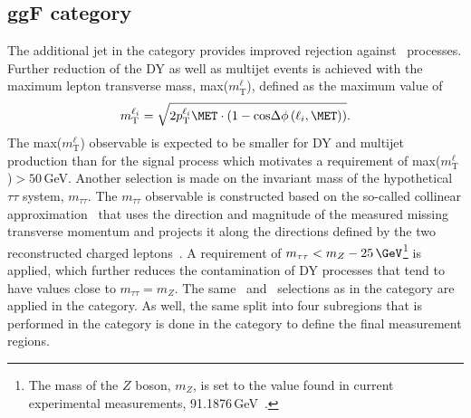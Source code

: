 \subsection{ggF \OneJet category}
\label{subsec:ggf-one-jet-category}
The additional jet in the \OneJet category provides improved rejection against \Ztautau\ processes.
Further reduction of the DY as well as multijet events is achieved with the maximum lepton transverse mass, max($m_{\text{T}}^\ell$), defined as the maximum value of 
\begin{equation}
    m_{\text{T}}^{\ell_i} = \sqrt{ 2 p_\text{T}^{\ell_i} \MET \cdot \left( 1 - \text{cos} \Delta \phi \left( \ell_i, \MET \right) \right) }.
\end{equation}
The max($m_{\text{T}}^\ell$) observable is expected to be smaller for DY and multijet production than for the signal process which motivates a requirement of max($m_{\text{T}}^\ell$)$ > 50\,$GeV.
Another selection is made on the invariant mass of the hypothetical $\tau\tau$ system, $m_{\tau\tau}$.
The $m_{\tau\tau}$ observable is constructed based on the so-called collinear approximation~\cite{Plehn:1999xi} that uses the direction and magnitude of the measured missing transverse momentum and projects it along the directions defined by the two reconstructed charged leptons~\cite{HWWPaper}.
A requirement of $m_{\tau\tau} < m_Z - 25\,\GeV$\footnote{The mass of the $Z$ boson, $m_Z$, is set to the value found in current experimental measurements, 91.1876\,GeV~\cite{PDG2020}.} is applied, which further reduces the contamination of DY processes that tend to have values close to $m_{\tau\tau} = m_Z$.
The same \mll\ and \DPhill\ selections as in the \ZeroJet category are applied in the \OneJet category.
As well, the same split into four subregions that is performed in the \ZeroJet category is done in the \OneJet category to define the final measurement regions. 

